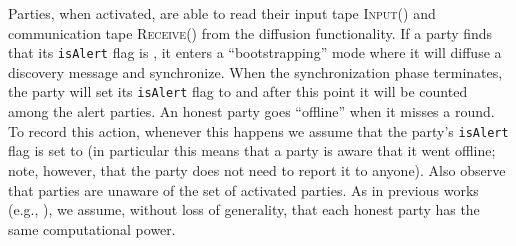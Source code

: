 Parties, when activated, are able to read their input tape \textsc{Input()} and communication tape \textsc{Receive()} from the diffusion functionality.
%
If a party finds that its \texttt{isAlert} flag is \false, it enters a ``bootstrapping'' mode where it will diffuse a discovery message and synchronize.
%
When the synchronization phase terminates, the party will set its \texttt{isAlert} flag to \true and after this point it will be counted among the alert parties.
%
An honest party goes ``offline'' when it misses a round.
%
To record this action, whenever this happens we assume that the party's \texttt{isAlert} flag is set to \false (in particular this means that a party is aware that it went offline; note, however, that the party does not need to report it to anyone).
%
Also observe that parties are unaware of the set of activated parties.
%
As in previous works (e.g., \cite{EC:GarKiaLeo15}), we assume, without loss of generality, that each honest party has the same computational power.

